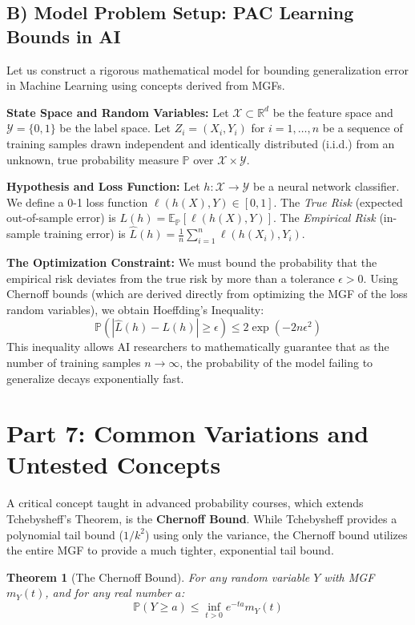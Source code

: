 \documentclass[11pt, a4paper]{article}
\newtheorem{theorem}{Theorem}[section]
\theoremstyle{definition}
\theoremstyle{remark}
\newcommand{\R}{\mathbb{R}}
\newcommand{\E}{\mathbb{E}}
\newcommand{\Prob}{\mathbb{P}}
\begin{document}
\subsection{B) Model Problem Setup: PAC Learning Bounds in AI}
Let us construct a rigorous mathematical model for bounding generalization error in Machine Learning using concepts derived from MGFs.

\textbf{State Space and Random Variables:} Let $\mathcal{X} \subset \R^d$ be the feature space and $\mathcal{Y} = \{0, 1\}$ be the label space. Let $Z_i = (X_i, Y_i)$ for $i = 1, \dots, n$ be a sequence of training samples drawn independent and identically distributed (i.i.d.) from an unknown, true probability measure $\Prob$ over $\mathcal{X} \times \mathcal{Y}$.

\textbf{Hypothesis and Loss Function:} Let $h: \mathcal{X} \to \mathcal{Y}$ be a neural network classifier. We define a 0-1 loss function $\ell(h(X), Y) \in [0, 1]$. 
The \textit{True Risk} (expected out-of-sample error) is $L(h) = \E_{\Prob}[\ell(h(X), Y)]$.
The \textit{Empirical Risk} (in-sample training error) is $\hat{L}(h) = \frac{1}{n} \sum_{i=1}^n \ell(h(X_i), Y_i)$.

\textbf{The Optimization Constraint:} We must bound the probability that the empirical risk deviates from the true risk by more than a tolerance $\epsilon > 0$. Using Chernoff bounds (which are derived directly from optimizing the MGF of the loss random variables), we obtain Hoeffding's Inequality:
\[ \Prob\left( |\hat{L}(h) - L(h)| \ge \epsilon \right) \le 2 \exp(-2n\epsilon^2) \]
This inequality allows AI researchers to mathematically guarantee that as the number of training samples $n \to \infty$, the probability of the model failing to generalize decays exponentially fast.

\newpage

\section{Part 7: Common Variations and Untested Concepts}

A critical concept taught in advanced probability courses, which extends Tchebysheff's Theorem, is the \textbf{Chernoff Bound}. While Tchebysheff provides a polynomial tail bound ($1/k^2$) using only the variance, the Chernoff bound utilizes the entire MGF to provide a much tighter, exponential tail bound.

\begin{theorem}[The Chernoff Bound]
For any random variable $Y$ with MGF $m_Y(t)$, and for any real number $a$:
\[ \Prob(Y \ge a) \le \inf_{t > 0} e^{-ta} m_Y(t) \]
\end{theorem}
\end{document}
